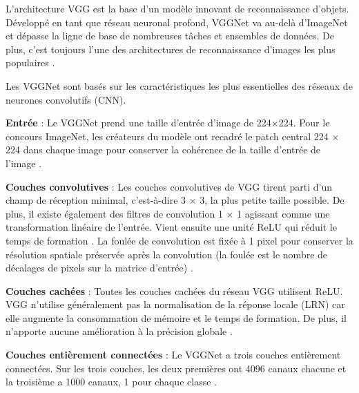 	L'architecture VGG est  la base d'un modèle innovant de reconnaissance d'objets. Développé en tant que réseau neuronal profond, VGGNet va au-delà d'ImageNet \cite{krizhevsky2012imagenet} et dépasse la ligne de base  de nombreuses tâches et ensembles de données. De plus, c'est toujours l'une des architectures de reconnaissance d'images les plus populaires \cite{tammina2019transfer, antoine2018apprentissage}.
	
	Les VGGNet sont basés sur les caractéristiques les plus essentielles des réseaux de neurones convolutifs (CNN). %
	
	\begin{list}{--}{Un bref coup d'œil à l'architecture de VGG :}
		\item \textbf{Entrée} : Le VGGNet prend une taille d'entrée d'image de 224×224. Pour le concours ImageNet, les créateurs du modèle ont recadré le patch central 224 × 224 dans chaque image pour conserver la cohérence de la taille d'entrée de l'image \cite{simonyan2014very}.
		
		\item \textbf{Couches convolutives }: Les couches convolutives de VGG tirent parti d'un champ de réception minimal, c'est-à-dire 3 × 3, la plus petite taille possible. De plus, il existe également des filtres de convolution 1 × 1 agissant comme une transformation linéaire de l'entrée. Vient ensuite une unité ReLU qui réduit le temps de formation \cite{krizhevsky2012imagenet,tammina2019transfer}. La foulée de convolution est fixée à 1 pixel pour conserver la résolution spatiale préservée après la convolution (la foulée est le nombre de décalages de pixels sur la matrice d'entrée) \cite{antoine2018apprentissage}.
		
		\item \textbf{Couches cachées} : Toutes les couches cachées du réseau VGG utilisent ReLU. VGG n'utilise généralement pas la normalisation de la réponse locale (LRN) car elle augmente la consommation de mémoire et le temps de formation. De plus, il n'apporte aucune amélioration à la précision globale \cite{tammina2019transfer}.
		
		\item \textbf{Couches entièrement connectées} : Le VGGNet a trois couches entièrement connectées. Sur les trois couches, les deux premières ont 4096 canaux chacune et la troisième a 1000 canaux, 1 pour chaque classe \cite{tammina2019transfer, antoine2018apprentissage}.
		
	\end{list}
	
